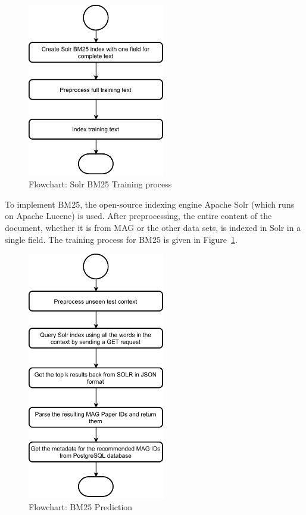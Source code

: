 \begin{figure}
\centering
 \includegraphics[width=6cm]{figures/Approach/bm25trainingflowchart.pdf}
  \caption{Flowchart: Solr BM25 Training process}
  \label{fig:bm25trainingflowchart}
\end{figure}
To implement BM25, the open-source indexing engine Apache Solr (which runs on Apache Lucene) is used. After preprocessing, the entire content of the document, whether it is from MAG or the other data sets, is indexed in Solr in a single field. 
The training process for BM25 is given in Figure~\ref{fig:bm25trainingflowchart}.
\begin{figure}[h]
 \centering
 \includegraphics[width=6cm]{figures/Approach/bm25testflowchart.pdf}
  \caption{Flowchart: BM25 Prediction}
  \label{fig:bm25predictflowchart}
\end{figure}
